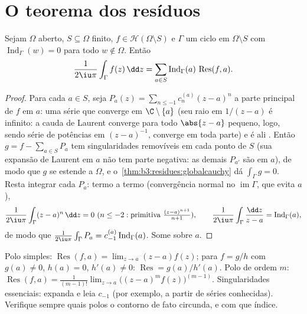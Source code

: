 \section{O teorema dos resíduos}

\begin{theorem}\label{thm:b3:residues:residue}
Sejam $\Omega$ aberto, $S \subseteq \Omega$ finito, $f \in
\mathcal H(\Omega\setminus S)$ e $\Gamma$ um ciclo em
$\Omega\setminus S$ com $\operatorname{Ind}_\Gamma(w) = 0$ para todo $w \notin \Omega$. Então
\[
\frac{1}{2\iu\pi}\int_\Gamma f(z)\,\dd z
= \sum_{a\in S}\operatorname{Ind}_\Gamma(a)\,
\operatorname{Res}(f, a) .
\]
\end{theorem}

\begin{proof}
Para cada $a \in S$, seja $P_a(z) = \sum_{n\leq-1}c_n^{(a)}(z -
a)^n$ a parte principal de $f$ em $a$: uma
série que converge em $\C\setminus\{a\}$ (seu raio em $1/(z-a)$ é infinito: a cauda de
Laurent converge para todo $\abs{z-a}$ pequeno, logo, sendo série de potências
em $(z-a)^{-1}$, converge em toda parte) e é ali . Então $g = f - \sum_{a\in S}P_a$ tem
singularidades removíveis em cada ponto de $S$ (sua expansão de
Laurent em $a$ não tem parte negativa: as demais $P_{a'}$ são
 em $a$), de modo que $g$ se estende  a
$\Omega$, e o~\cref{thm:b3:residues:globalcauchy} dá $\int_\Gamma g = 0$. Resta integrar cada
$P_a$: termo a termo (convergência normal no  $\operatorname{im}\Gamma$, que
evita $a$),
\[
\frac1{2\iu\pi}\int_\Gamma(z - a)^n\,\dd z = 0 \ (n \leq -2:
\text{primitiva } \tfrac{(z-a)^{n+1}}{n+1}),
\qquad
\frac1{2\iu\pi}\int_\Gamma\frac{\dd z}{z - a} =
\operatorname{Ind}_\Gamma(a),
\]
de modo que $\frac1{2\iu\pi}\int_\Gamma P_a =
c_{-1}^{(a)}\operatorname{Ind}_\Gamma(a)$. Some sobre $a$.
\end{proof}

\begin{method}\label{met:b3:residues:compute}
Polo simples: $\operatorname{Res}(f, a) = \lim_{z\to a}(z -
a)f(z)$; para $f = g/h$ com $g(a) \neq 0$, $h(a) = 0$, $h'(a)
\neq 0$: $\operatorname{Res} = g(a)/h'(a)$. Polo de
ordem $m$: $\operatorname{Res}(f, a) = \frac1{(m-1)!}\lim_{z\to
a}\bigl((z-a)^mf(z)\bigr)^{(m-1)}$. Singularidades essenciais: expanda e leia
$c_{-1}$ (por exemplo, a partir de séries conhecidas). Verifique
sempre quais polos o contorno de fato circunda, e com que índice.
\end{method}

